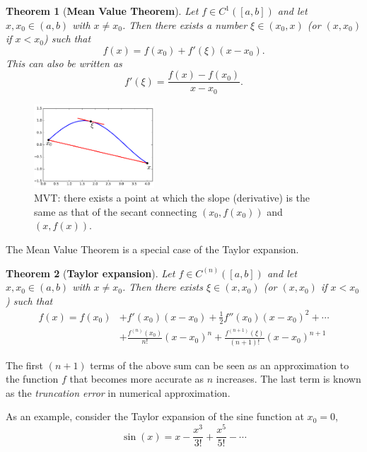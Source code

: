 \documentclass[11pt,a4paper]{memoir}
\newtheorem*{theorem*}{Theorem}
\begin{document}
\begin{theorem*}[\textbf{Mean Value Theorem}]
Let $f\in C^1([a,b])$ and let $x,x_0\in (a,b)$ with $x\neq x_0$. 
Then there exists a number $\xi\in (x_0,x)$ (or $(x,x_0)$ if $x<x_0$) such that
\begin{equation*}
  f(x) = f(x_0)+f'(\xi)(x-x_0).
\end{equation*}
This can also be written as
\begin{equation*}
  f'(\xi) = \frac{f(x)-f(x_0)}{x-x_0}.
\end{equation*}
\end{theorem*}

\begin{figure}[h!]
\centering
\includegraphics[width=0.4\textwidth]{images/mvt.pdf}
\caption{\small MVT: there exists a point at which the slope (derivative) is the same as that of the secant connecting $(x_0,f(x_0))$ and $(x,f(x))$.}
\end{figure}

The Mean Value Theorem is a special case of the Taylor expansion.

\begin{theorem*}[\textbf{Taylor expansion}]
Let $f\in C^{(n)}([a,b])$ and let $x,x_0\in(a,b)$ with $x\neq x_0$. Then
there exists $\xi\in (x,x_0)$ (or $(x,x_0)$ if $x<x_0$) such that
\begin{align*}
  f(x) = f(x_0)&+f'(x_0)(x-x_0)+\frac{1}{2}f''(x_0)(x-x_0)^2+\cdots \\
   &+\frac{f^{(n)}(x_0)}{n!}(x-x_0)^n + \frac{f^{(n+1)}(\xi)}{(n+1)!}(x-x_0)^{n+1}
\end{align*}
\end{theorem*}

The first $(n+1)$ terms of the above sum can be seen as an approximation to the function $f$ that becomes more accurate as $n$ increases. 
The last term is known as the {\em truncation error} in numerical approximation.

As an example, consider the Taylor expansion of the sine function at $x_0=0$,
\begin{equation*}
\sin(x) = x-\frac{x^3}{3!}+\frac{x^5}{5!}-\cdots
\end{equation*}
\end{document}
